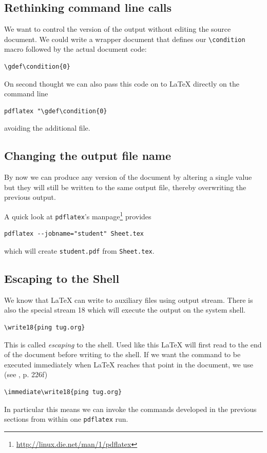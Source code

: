 \documentclass{maps}
\begin{document}
\subsection{Rethinking command line calls}

We want to control the version of the output without editing the source document. We could write a wrapper document that defines our \verb+\condition+ macro followed by the actual document code:
\begin{lstlisting}[language={[LaTeX]TeX}, style=arn:lst]
\gdef\condition{0}

\end{lstlisting}
On second thought we can also pass this code on to \LaTeX{} directly on the command line
\begin{verbatim}
pdflatex "\gdef\condition{0} 
\end{verbatim}
avoiding the additional file.

\subsection{Changing the output file name}
By now we can produce any version of the document by altering a single value but they will still be written to the same output file, thereby overwriting the previous output.

A quick look at \texttt{pdflatex}'s manpage\footnote{\url{http://linux.die.net/man/1/pdflatex}} provides
\begin{verbatim}
pdflatex --jobname="student" Sheet.tex
\end{verbatim}
which will create \texttt{student.pdf} from \texttt{Sheet.tex}.

\subsection{Escaping to the Shell}
We know that \LaTeX{} can write to auxiliary files using output stream.
There is also the special stream 18 which will execute the output on the system shell. 
\begin{verbatim}
\write18{ping tug.org}
\end{verbatim}
This is called \textit{escaping} to the shell. Used like this \LaTeX{} will first read
to the end of the document before writing to the shell. 
If we want the command to be executed immediately when \LaTeX{} reaches that point in the document, we use (see \cite{arn:knuth}, p. 226f)
\begin{verbatim}
\immediate\write18{ping tug.org}
\end{verbatim}
In particular this means we can invoke the commands developed in the previous sections from within one \texttt{pdflatex} run.
\end{document}
